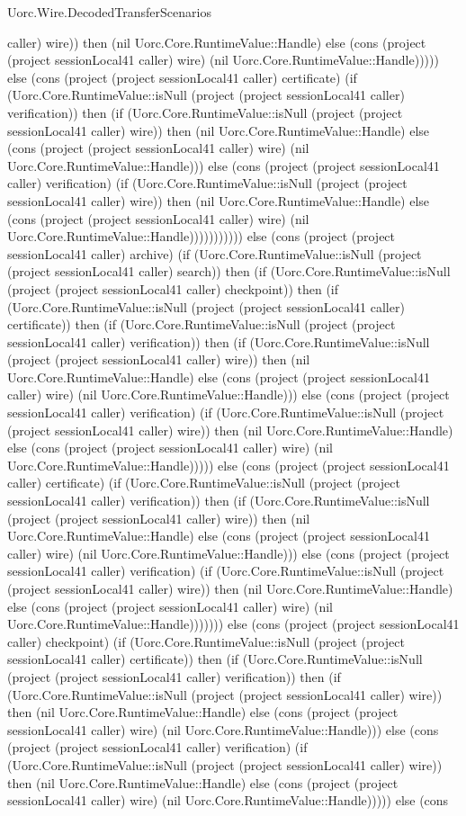 \begin{lexlean}{Uorc.Wire.DecodedTransferScenarios}
\begin{semanticmodule}
{caller) wire)) then (nil Uorc.Core.RuntimeValue::Handle) else (cons (project (project sessionLocal41 caller) wire) (nil Uorc.Core.RuntimeValue::Handle))))) else (cons (project (project sessionLocal41 caller) certificate) (if (Uorc.Core.RuntimeValue::isNull (project (project sessionLocal41 caller) verification)) then (if (Uorc.Core.RuntimeValue::isNull (project (project sessionLocal41 caller) wire)) then (nil Uorc.Core.RuntimeValue::Handle) else (cons (project (project sessionLocal41 caller) wire) (nil Uorc.Core.RuntimeValue::Handle))) else (cons (project (project sessionLocal41 caller) verification) (if (Uorc.Core.RuntimeValue::isNull (project (project sessionLocal41 caller) wire)) then (nil Uorc.Core.RuntimeValue::Handle) else (cons (project (project sessionLocal41 caller) wire) (nil Uorc.Core.RuntimeValue::Handle))))))))))) else (cons (project (project sessionLocal41 caller) archive) (if (Uorc.Core.RuntimeValue::isNull (project (project sessionLocal41 caller) search)) then (if (Uorc.Core.RuntimeValue::isNull (project (project sessionLocal41 caller) checkpoint)) then (if (Uorc.Core.RuntimeValue::isNull (project (project sessionLocal41 caller) certificate)) then (if (Uorc.Core.RuntimeValue::isNull (project (project sessionLocal41 caller) verification)) then (if (Uorc.Core.RuntimeValue::isNull (project (project sessionLocal41 caller) wire)) then (nil Uorc.Core.RuntimeValue::Handle) else (cons (project (project sessionLocal41 caller) wire) (nil Uorc.Core.RuntimeValue::Handle))) else (cons (project (project sessionLocal41 caller) verification) (if (Uorc.Core.RuntimeValue::isNull (project (project sessionLocal41 caller) wire)) then (nil Uorc.Core.RuntimeValue::Handle) else (cons (project (project sessionLocal41 caller) wire) (nil Uorc.Core.RuntimeValue::Handle))))) else (cons (project (project sessionLocal41 caller) certificate) (if (Uorc.Core.RuntimeValue::isNull (project (project sessionLocal41 caller) verification)) then (if (Uorc.Core.RuntimeValue::isNull (project (project sessionLocal41 caller) wire)) then (nil Uorc.Core.RuntimeValue::Handle) else (cons (project (project sessionLocal41 caller) wire) (nil Uorc.Core.RuntimeValue::Handle))) else (cons (project (project sessionLocal41 caller) verification) (if (Uorc.Core.RuntimeValue::isNull (project (project sessionLocal41 caller) wire)) then (nil Uorc.Core.RuntimeValue::Handle) else (cons (project (project sessionLocal41 caller) wire) (nil Uorc.Core.RuntimeValue::Handle))))))) else (cons (project (project sessionLocal41 caller) checkpoint) (if (Uorc.Core.RuntimeValue::isNull (project (project sessionLocal41 caller) certificate)) then (if (Uorc.Core.RuntimeValue::isNull (project (project sessionLocal41 caller) verification)) then (if (Uorc.Core.RuntimeValue::isNull (project (project sessionLocal41 caller) wire)) then (nil Uorc.Core.RuntimeValue::Handle) else (cons (project (project sessionLocal41 caller) wire) (nil Uorc.Core.RuntimeValue::Handle))) else (cons (project (project sessionLocal41 caller) verification) (if (Uorc.Core.RuntimeValue::isNull (project (project sessionLocal41 caller) wire)) then (nil Uorc.Core.RuntimeValue::Handle) else (cons (project (project sessionLocal41 caller) wire) (nil Uorc.Core.RuntimeValue::Handle))))) else (cons }
\end{semanticmodule}
\end{lexlean}
